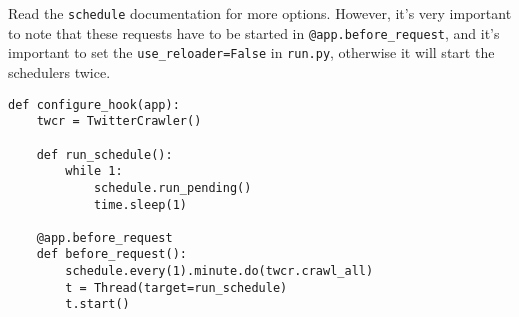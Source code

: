 \documentclass[../main/main.tex]{subfiles}
\begin{document}
Read the \lstinline|schedule| documentation for more options. However, it's very
important to note that these requests have to be started in
\lstinline|@app.before_request|, and it's important to set the
\lstinline|use_reloader=False| in \lstinline|run.py|, otherwise it will start
the schedulers twice. 

\begin{lstlisting}
def configure_hook(app):
    twcr = TwitterCrawler()

    def run_schedule():
        while 1:
            schedule.run_pending()
            time.sleep(1)

    @app.before_request
    def before_request():
        schedule.every(1).minute.do(twcr.crawl_all)
        t = Thread(target=run_schedule)
        t.start()
\end{lstlisting}

% 
\end{document}
